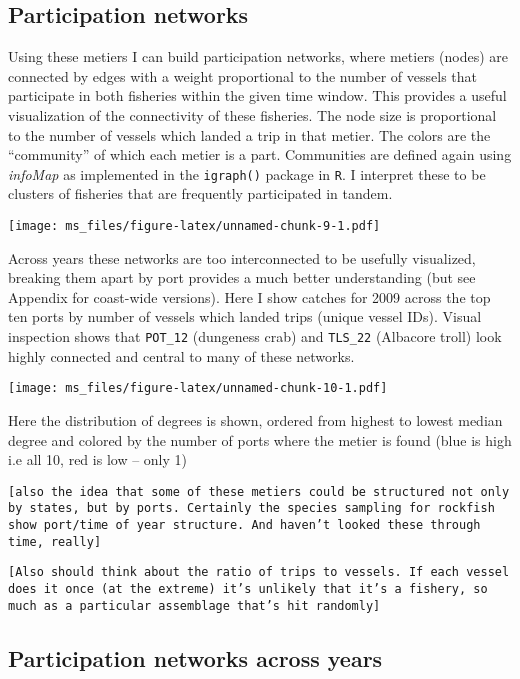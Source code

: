 \documentclass[]{article}
\begin{document}
\subsection{Participation networks}\label{participation-networks}

Using these metiers I can build participation networks, where metiers
(nodes) are connected by edges with a weight proportional to the number
of vessels that participate in both fisheries within the given time
window. This provides a useful visualization of the connectivity of
these fisheries. The node size is proportional to the number of vessels
which landed a trip in that metier. The colors are the ``community'' of
which each metier is a part. Communities are defined again using
\emph{infoMap} as implemented in the \texttt{igraph()} package in
\texttt{R}. I interpret these to be clusters of fisheries that are
frequently participated in tandem.

\texttt{[image: ms\_files/figure-latex/unnamed-chunk-9-1.pdf]}

Across years these networks are too interconnected to be usefully
visualized, breaking them apart by port provides a much better
understanding (but see Appendix for coast-wide versions). Here I show
catches for 2009 across the top ten ports by number of vessels which
landed trips (unique vessel IDs). Visual inspection shows that
\texttt{POT\_12} (dungeness crab) and \texttt{TLS\_22} (Albacore troll)
look highly connected and central to many of these networks.

\texttt{[image: ms\_files/figure-latex/unnamed-chunk-10-1.pdf]}

Here the distribution of degrees is shown, ordered from highest to
lowest median degree and colored by the number of ports where the metier
is found (blue is high i.e all 10, red is low -- only 1)

\texttt{{[}also the idea that some of these metiers could be structured not only by states, but by ports. Certainly the species sampling for rockfish show port/time of year structure. And haven't looked these through time, really{]}}

\texttt{{[}Also should think about the ratio of trips to vessels. If each vessel does it once (at the extreme) it's unlikely that it's a fishery, so much as a particular assemblage that's hit randomly{]}}

\subsection{Participation networks across
years}\label{participation-networks-across-years}
\end{document}
